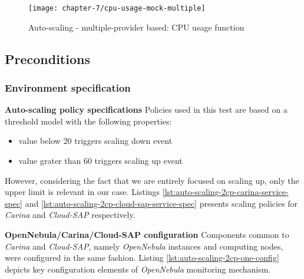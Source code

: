 \begin{figure}[!ht]
  \begin{center}
    \texttt{[image: chapter-7/cpu-usage-mock-multiple]}
  \end{center}
  \caption{Auto-scaling - multiple-provider based: CPU usage function}
  \label{eval:auto-scaling-2cp-cpu-usage-function}
\end{figure}

\subsection*{Preconditions}
\subsubsection*{Environment specification}
\begin{asparaenum}
  \item[\textbf{Auto-scaling policy specifications}] Policies used in this test are based on a threshold model with the following properties:
  \begin{itemize}
   \item value below 20 triggers scaling down event
   \item value grater than 60 triggers scaling up event
  \end{itemize}
  However, considering the fact that we are entirely focused on scaling up, only the upper limit is relevant in our case. Listings \ref{lst:auto-scaling-2cp-carina-service-spec} and \ref{lst:auto-scaling-2cp-cloud-sap-service-spec} presents scaling policies for \emph{Carina} and \emph{Cloud-SAP} respectively.
  
  
  
  
  \item[\textbf{OpenNebula/Carina/Cloud-SAP configuration}] 
  Components common to \emph{Carina} and \emph{Cloud-SAP}, namely \emph{OpenNebula} instances and computing nodes, were configured in the same fashion. Listing \ref{lst:auto-scaling-2cp-one-config} depicts key configuration elements of \emph{OpenNebula} monitoring mechanism.
  

\end{asparaenum}
